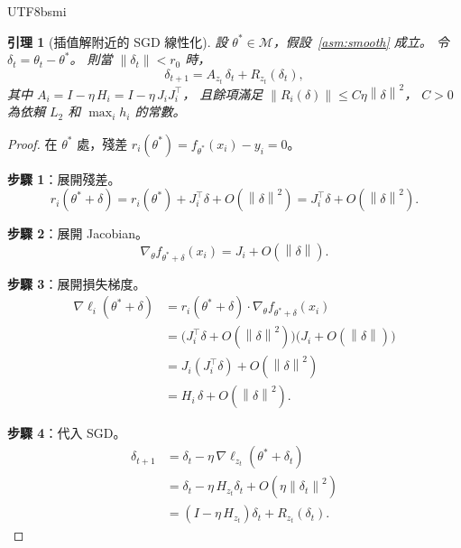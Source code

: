 \documentclass[11pt,a4paper]{article}
\newtheorem{lemma}[theorem]{引理}
\theoremstyle{definition}
\newcommand{\cM}{\mathcal{M}}
\newcommand{\norm}[1]{\left\|#1\right\|}
\begin{document}
\begin{CJK}{UTF8}{bsmi}
\begin{lemma}[插值解附近的 SGD 線性化]\label{lem:linearize}
  設 $\theta^* \in \cM$，假設~\ref{asm:smooth} 成立。
  令 $\delta_t = \theta_t - \theta^*$。
  則當 $\norm{\delta_t} < r_0$ 時，
  \[
    \delta_{t+1} = A_{z_t}\,\delta_t + R_{z_t}(\delta_t),
  \]
  其中 $A_i = I - \eta\,H_i = I - \eta\,J_i J_i^\top$，
  且餘項滿足 $\norm{R_i(\delta)} \leq C\eta\norm{\delta}^2$，
  $C > 0$ 為依賴 $L_2$ 和 $\max_i h_i$ 的常數。
\end{lemma}

\begin{proof}
  在 $\theta^*$ 處，殘差 $r_i(\theta^*) = f_{\theta^*}(x_i) - y_i = 0$。

  \textbf{步驟 1}：展開殘差。
  \[
    r_i(\theta^* + \delta) = r_i(\theta^*) + J_i^\top\delta + O(\norm{\delta}^2)
    = J_i^\top\delta + O(\norm{\delta}^2).
  \]

  \textbf{步驟 2}：展開 Jacobian。
  \[
    \nabla_\theta f_{\theta^*+\delta}(x_i) = J_i + O(\norm{\delta}).
  \]

  \textbf{步驟 3}：展開損失梯度。
  \begin{align*}
    \nabla\ell_i(\theta^*+\delta)
    &= r_i(\theta^*+\delta)\cdot\nabla_\theta f_{\theta^*+\delta}(x_i)\\
    &= \bigl(J_i^\top\delta + O(\norm{\delta}^2)\bigr)\bigl(J_i + O(\norm{\delta})\bigr)\\
    &= J_i(J_i^\top\delta) + O(\norm{\delta}^2)\\
    &= H_i\,\delta + O(\norm{\delta}^2).
  \end{align*}

  \textbf{步驟 4}：代入 SGD。
  \begin{align*}
    \delta_{t+1}
    &= \delta_t - \eta\,\nabla\ell_{z_t}(\theta^*+\delta_t)\\
    &= \delta_t - \eta\,H_{z_t}\delta_t + O(\eta\norm{\delta_t}^2)\\
    &= (I - \eta\,H_{z_t})\delta_t + R_{z_t}(\delta_t).
  \end{align*}


\end{proof}
\end{CJK}
\end{document}

